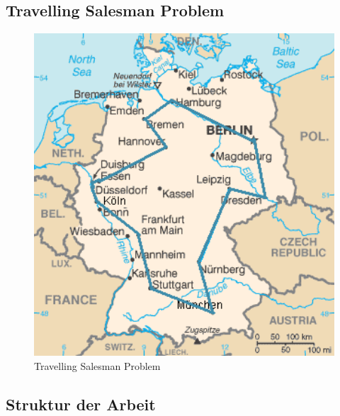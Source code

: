\subsection{Travelling Salesman Problem}
\begin{figure}[H]
\centering
\includegraphics[width=1\textwidth]{img/Vortrag/TSP_Deutschland.png}
\caption{Travelling Salesman Problem}
\label{fig:TSP}
\end{figure}

\subsection{Struktur der Arbeit}

